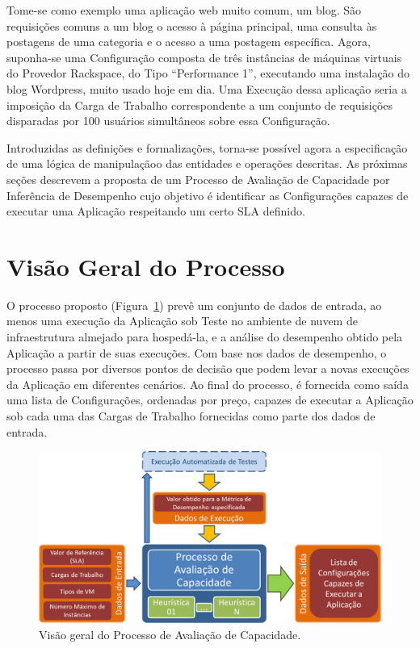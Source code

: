 Tome-se como exemplo uma aplicação web muito comum, um blog. São requisições 
comuns a um blog o acesso à página principal, uma consulta às postagens de uma
categoria e o acesso a uma postagem específica. Agora, suponha-se uma Configuração
composta de três instâncias de máquinas virtuais do Provedor Rackspace, do Tipo 
``Performance 1'', executando uma instalação do blog Wordpress, muito usado hoje em 
dia. Uma Execução dessa aplicação seria a imposição da Carga de Trabalho correspondente
a um conjunto de requisições disparadas por 100 usuários simultâneos sobre essa Configuração. 

Introduzidas as definições e formalizações, torna-se possível agora a especificação 
de uma lógica de manipulaçãoo das entidades e operações descritas. As próximas 
seções descrevem a proposta de um Processo de Avaliação de Capacidade por 
Inferência de Desempenho cujo objetivo é identificar as Configurações capazes
de executar uma Aplicação respeitando um certo SLA definido.

\section{Visão Geral do Processo}
\label{sec:processo_visao_geral}

O processo proposto (Figura~\ref{fig:fig_processo_alto_nivel}) prevê um conjunto de
dados de entrada, ao menos uma execução da Aplicação sob Teste no ambiente de nuvem de infraestrutura almejado para 
hospedá-la, e a análise do desempenho obtido pela Aplicação a partir 
de suas execuções. Com base nos dados de desempenho, o processo passa por diversos
pontos de decisão que podem levar a novas execuções da Aplicação em diferentes 
cenários. Ao final do processo, é fornecida como saída uma lista de Configurações, 
ordenadas por preço, capazes de executar a Aplicação sob cada uma das Cargas de 
Trabalho fornecidas como parte dos dados de entrada.

\begin{figure}[t]
  \begin{center}
    \includegraphics[scale=0.6]{img/processoAltoNivel}
  \end{center}
  \caption{\label{fig:fig_processo_alto_nivel}Visão geral do Processo de
  Avaliação de Capacidade.}
\end{figure}

